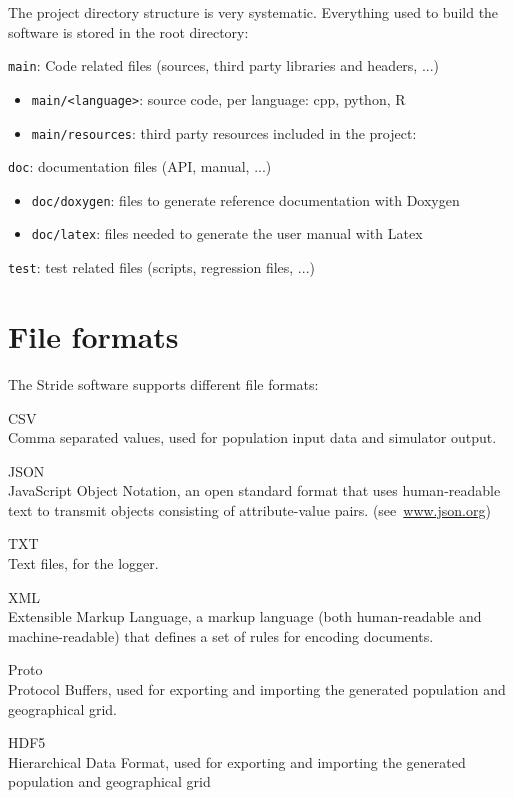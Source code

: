 The project directory structure is very systematic.
Everything used to build the software is stored in the root directory:
\begin{compactitem}
    \item \texttt{main}: Code related files (sources, third party libraries and headers, ...)
      	\begin{itemize}
        		\item \texttt{main/<language>}: source code, per language: cpp, python, R
        		\item \texttt{main/resources}: third party resources included in the project:
        \end{itemize}
    \item \texttt{doc}: documentation files (API, manual, ...)
      	\begin{itemize}
        		\item \texttt{doc/doxygen}: files to generate reference documentation with Doxygen
        		\item \texttt{doc/latex}: files needed to generate the user manual with Latex
        \end{itemize}
    \item \texttt{test}: test related files (scripts, regression files, ...)
\end{compactitem}

\section{File formats}
\label{section:FileFormats}

The Stride software supports different file formats:
\begin{compactdesc}
	\item [CSV] \ \\
	Comma separated values, used for population input data and simulator output.
	\item [JSON] \ \\
	JavaScript Object Notation, an open standard format that uses human-readable text to transmit objects consisting of attribute-value pairs. 	 \mbox{(see \url{www.json.org})}
	\item [TXT] \ \\
	Text files, for the logger.
	\item [XML] \ \\
	Extensible Markup Language, a markup language (both human-readable and machine-readable) that defines a set of rules for encoding documents.
    \item [Proto] \ \\
    Protocol Buffers, used for exporting and importing the generated population and geographical grid.
    \item [HDF5] \ \\
    Hierarchical Data Format, used for exporting and importing the generated population and geographical grid
\end{compactdesc}


